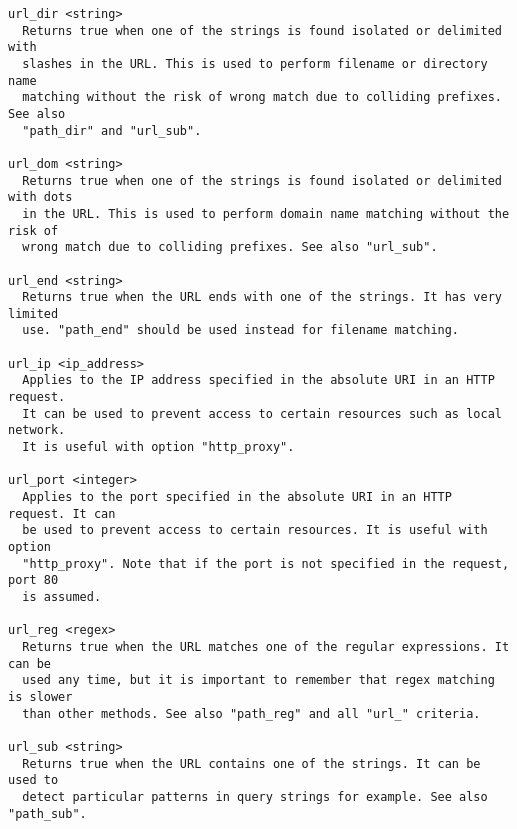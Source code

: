 \begin{verbatim}
url_dir <string>
  Returns true when one of the strings is found isolated or delimited with
  slashes in the URL. This is used to perform filename or directory name
  matching without the risk of wrong match due to colliding prefixes. See also
  "path_dir" and "url_sub".

url_dom <string>
  Returns true when one of the strings is found isolated or delimited with dots
  in the URL. This is used to perform domain name matching without the risk of
  wrong match due to colliding prefixes. See also "url_sub".

url_end <string>
  Returns true when the URL ends with one of the strings. It has very limited
  use. "path_end" should be used instead for filename matching.

url_ip <ip_address>
  Applies to the IP address specified in the absolute URI in an HTTP request.
  It can be used to prevent access to certain resources such as local network.
  It is useful with option "http_proxy".

url_port <integer>
  Applies to the port specified in the absolute URI in an HTTP request. It can
  be used to prevent access to certain resources. It is useful with option
  "http_proxy". Note that if the port is not specified in the request, port 80
  is assumed.

url_reg <regex>
  Returns true when the URL matches one of the regular expressions. It can be
  used any time, but it is important to remember that regex matching is slower
  than other methods. See also "path_reg" and all "url_" criteria.

url_sub <string>
  Returns true when the URL contains one of the strings. It can be used to
  detect particular patterns in query strings for example. See also "path_sub".


\end{verbatim}
